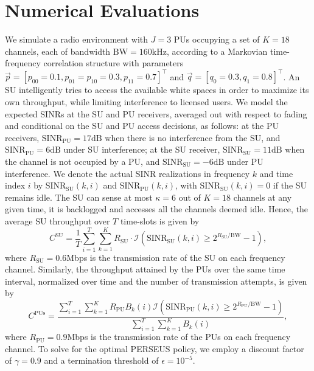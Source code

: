 \documentclass[10pt,twocolumn]{IEEEtran}
\begin{document}
\section{Numerical Evaluations}\label{IV}
We simulate a radio environment with $J{=}3$ PUs occupying a set of $K{=}18$ channels, each of bandwidth $\text{BW}{=}160 \text{kHz}$, according to a Markovian time-frequency correlation structure with parameters $\vec{p}{=}[p_{00}{=}0.1,p_{01}{=}p_{10}{=}0.3,p_{11}{=}0.7]^\top$ and $\vec{q}{=}[q_{0}{=}0.3,q_{1}{=}0.8]^\top$. An SU intelligently tries to access the available white spaces in order to maximize its own throughput, while limiting interference to licensed users. We model the expected SINRs at the SU and PU receivers, averaged out with respect to fading and conditional on the SU and PU access decisions, as follows: at the PU receivers,
$\text{SINR}_{\text{PU}}{=}17\text{dB}$ when there is no interference from the SU, and $\text{SINR}_{\text{PU}}{=}6\text{dB}$ under SU interference; 
at the SU receiver, $\text{SINR}_{\text{SU}}{=}11\text{dB}$ when the channel is not occupied by a PU, and $\text{SINR}_{\text{SU}}{=}{-}6\text{dB}$ under PU interference. We denote the actual SINR realizations in frequency $k$ and time index $i$ by $\text{SINR}_{\text{SU}}(k,i)$ and $\text{SINR}_{\text{PU}}(k,i)$, with $\text{SINR}_{\text{SU}}(k,i){=}0$ if the SU remains idle. The SU can sense at most $\kappa{=}6$ out of $K{=}18$ channels at any given time, it is backlogged and accesses all the channels deemed idle. Hence, the average SU throughput over $T$ time-slots is given by $$C^{\text{SU}} = \frac{1}{T}\sum_{i=1}^T \sum_{k=1}^{K} R_{\text{SU}} \cdot \mathcal{I}\left(\text{SINR}_{\text{SU}}(k,i) \geq 2^{R_{\text{SU}}/\text{BW}} - 1\right),$$ where $R_{\text{SU}}{=}0.6$Mbps is the transmission rate of the SU on each frequency channel. Similarly, the throughput attained by the PUs over the same time interval, normalized over time and the number of transmission attempts, is given by $$C^{\text{PUs}}{=}\frac{\sum_{i=1}^{T}\sum_{k=1}^{K}R_{\text{PU}}B_{k}(i)\mathcal{I}\left(\text{SINR}_{\text{PU}}(k,i){\geq}2^{R_{\text{PU}}/\text{BW}}{-}1\right)}{\sum_{i=1}^T\sum_{k=1}^{K}B_{k}(i)},$$ where $R_{\text{PU}}{=}0.9$Mbps is the transmission rate of the PUs on each frequency channel. To solve for the optimal PERSEUS policy, we employ a discount factor of $\gamma{=}0.9$ and a termination threshold of $\epsilon{=}10^{-5}$.
\end{document}
